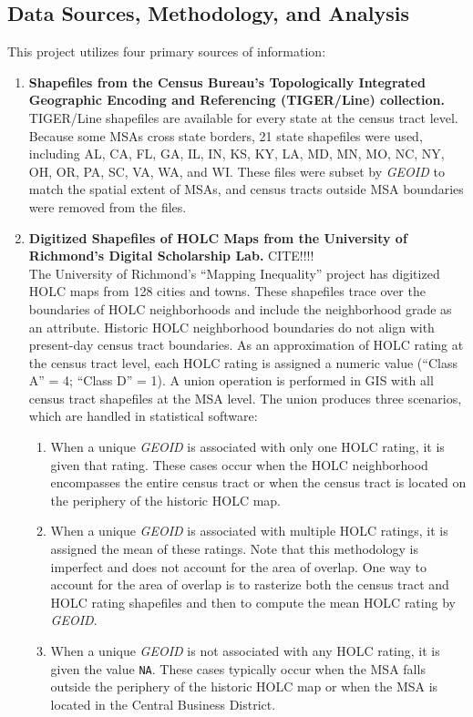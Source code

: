 \documentclass[paper=letter, fontsize=12pt]{scrartcl} %
\begin{document}
\subsection{Data Sources, Methodology, and Analysis}
This project utilizes four primary sources of information:
\begin{enumerate}
	\item \textbf{Shapefiles from the Census Bureau's Topologically Integrated Geographic Encoding and Referencing (TIGER/Line) collection.} \cite{tiger17}\\
	TIGER/Line shapefiles are available for every state at the census tract level. Because some MSAs cross state borders, 21 state shapefiles were used, including AL, CA, FL, GA, IL, IN, KS, KY, LA, MD, MN, MO, NC, NY, OH, OR, PA, SC, VA, WA, and WI. These files were subset by \textit{GEOID} to match the spatial extent of MSAs, and census tracts outside MSA boundaries were removed from the files.
	\item \textbf{Digitized Shapefiles of HOLC Maps from the University of Richmond's Digital Scholarship Lab.} CITE!!!! \\
	The University of Richmond's ``Mapping Inequality'' project has digitized HOLC maps from 128 cities and towns. These shapefiles trace over the boundaries of HOLC neighborhoods and include the neighborhood grade as an attribute. Historic HOLC neighborhood boundaries do not align with present-day census tract boundaries. As an approximation of HOLC rating at the census tract level, each HOLC rating is assigned a numeric value (``Class A'' = 4; ``Class D'' = 1). A union operation is performed in GIS with all census tract shapefiles at the MSA level. The union produces three scenarios, which are handled in statistical software:
	\begin{enumerate}
		\item When a unique \textit{GEOID} is associated with only one HOLC rating, it is given that rating. These cases occur when the HOLC neighborhood encompasses the entire census tract or when the census tract is located on the periphery of the historic HOLC map.
		\item When a unique \textit{GEOID} is associated with multiple HOLC ratings, it is assigned the mean of these ratings. Note that this methodology is imperfect and does not account for the area of overlap. One way to account for the area of overlap is to rasterize both the census tract and HOLC rating shapefiles and then to compute the mean HOLC rating by \textit{GEOID}.
		\item When a unique \textit{GEOID} is not associated with any HOLC rating, it is given the value \texttt{NA}. These cases typically occur when the MSA falls outside the periphery of the historic HOLC map or when the MSA is located in the Central Business District.

\end{enumerate}
\end{enumerate}
\end{document}
